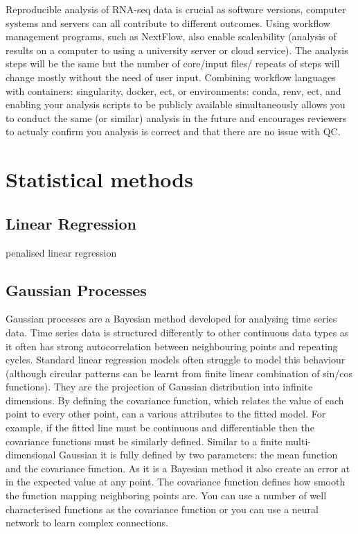 \documentclass[../main.tex]{subfiles}
\begin{document}
Reproducible analysis of RNA-seq data is crucial as software versions, computer systems and servers can all contribute to different outcomes. Using workflow management programs, such as NextFlow, also enable scaleability (analysis of results on a computer to using a university server or cloud service). The analysis steps will be the same but the number of core/input files/ repeats of steps will change mostly without the need of user input. Combining workflow languages with containers: singularity, docker, ect, or environments: conda, renv, ect, and enabling your analysis scripts to be publicly available simultaneously allows you to conduct the same (or similar) analysis in the future and encourages reviewers to actualy confirm you analysis is correct and that there are no issue with QC.

\section{Statistical methods}

\subsection{Linear Regression}

penalised linear regression

\subsection{Gaussian Processes}
Gaussian processes are a Bayesian method developed for analysing time series data. Time series data is structured differently to other continuous data types as it often has strong autocorrelation between neighbouring points and repeating cycles. Standard linear regression models often struggle to model this behaviour (although circular patterns can be learnt from finite linear combination of sin/cos functions). They are the projection of Gaussian distribution into infinite dimensions. By defining the covariance function, which relates the value of each point to every other point, can a various attributes to the fitted model. For example, if the fitted line must be continuous and differentiable then the covariance functions must be similarly defined. Similar to a finite multi-dimensional Gaussian it is fully defined by two parameters:  the mean function and the covariance function. As it is a Bayesian method it also create an error at in the expected value at any point. The covariance function defines how smooth the function mapping neighboring points are. You can use a number of well characterised functions as the covariance function or you can use a neural network to learn complex connections. 
\end{document}
